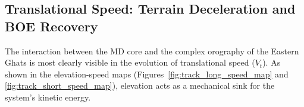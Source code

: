 %
%

\subsection{Translational Speed: Terrain Deceleration and BOE Recovery}
\label{subsec:ts_speed}

The interaction between the MD core and the complex orography of the
Eastern Ghats is most clearly visible in the evolution of
translational speed ($V_t$). As shown in the elevation-speed maps
(Figures~\ref{fig:track_long_speed_map} and
\ref{fig:track_short_speed_map}), elevation acts as a mechanical sink
for the system's kinetic energy.

